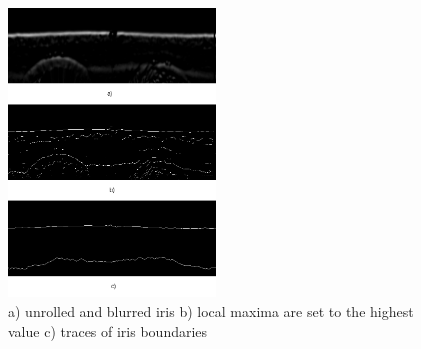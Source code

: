 \documentclass[journal]{IEEEtran}
\begin{document}
\begin{figure}[ht]
	\centering
  \includegraphics[width=0.49\textwidth]{iris/unrolled.png}
	\caption{a) unrolled and blurred iris b) local maxima are set to the highest value c) traces of iris boundaries}
	\label{fig:unrolled}
\end{figure}
\end{document}
